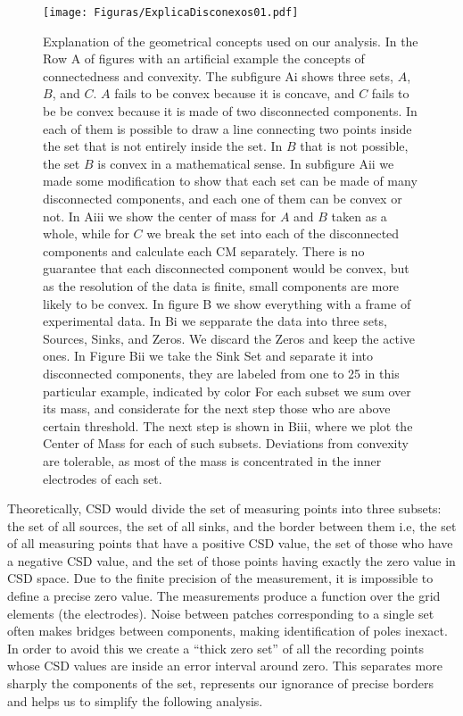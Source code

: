 \documentclass[12pt]{article}
\begin{document}
\begin{figure}
  \texttt{[image: Figuras/ExplicaDisconexos01.pdf]}
  \caption{ Explanation of the geometrical concepts used on our analysis.
    In the Row A of figures
    with an artificial example the concepts of connectedness and convexity.
    The subfigure Ai shows
    three sets, $A$, $B$, and $C$. $A$ fails to be convex because it is concave,
    and $C$ fails to be
    be convex because it is made of two disconnected components.
    In each of them is possible to draw a line
    connecting two points inside the set that is not entirely inside the set.
    In $B$ that is not possible, the set $B$ is convex in a mathematical sense.
    In subfigure Aii we made some modification to show that
    each set can be made of many disconnected components,
    and each one of them can be convex or not.  In Aiii we show the center of
    mass for $A$ and $B$
    taken as a whole, while for $C$ we break the set into each of the disconnected
    components and calculate each CM separately. There is no guarantee that each
    disconnected component would be convex, but as the resolution of the data is finite,
    small components are more likely to
    be convex. In figure B we show everything with a frame of experimental data.
    In Bi we sepparate the
    data into three sets, Sources, Sinks, and Zeros.
    We discard the Zeros and keep the active ones.
    In Figure Bii we take the Sink Set and separate it into disconnected components,
    they are labeled from one to 25 in this particular example,
    indicated by color
    For each subset we sum over its mass, and 
    considerate for the next step those who are above certain threshold. The
    next step is shown in Biii, where we plot the Center of Mass for each of
    such subsets. Deviations
    from convexity are tolerable,
    as most of the mass is concentrated in the inner electrodes
    of each set.
  }
  \label{disconnectedsets}
\end{figure}



Theoretically, CSD would divide the set of measuring points into three subsets: the set of all sources, the set of all sinks, and the border between them i.e, the set of all measuring points that have a positive CSD  value, the set of those who have a negative CSD value, and the set of those points having exactly the zero value in CSD space.
Due to the finite precision of the measurement,
it is impossible to define a precise zero value.
The measurements produce a function over the grid elements (the electrodes).
Noise between patches corresponding to a single set often makes bridges
between components, making identification of poles inexact.
In order to avoid this we create a ``thick zero set'' of all the recording
points whose CSD values are inside an error interval around zero.
This separates more sharply the components of the set,
represents our ignorance of precise borders and helps
us to simplify the following analysis.
\end{document}

